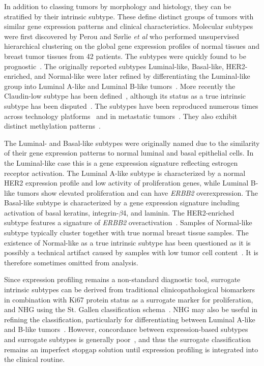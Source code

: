 \documentclass[11pt]{book}
\begin{document}
In addition to classing tumors by morphology and histology, they can be stratified by their intrinsic subtype. These define distinct groups of tumors with similar gene expression patterns and clinical characteristics. Molecular subtypes were first discovered by Perou and Sørlie \textit{et al} \cite{Perou:2000} who performed unsupervised hierarchical clustering on the global gene expression profiles of normal tissues and breast tumor tissues from 42 patients. The subtypes were quickly found to be prognostic~\cite{Sorlie:2001}. The originally reported subtypes Luminal-like, Basal-like, HER2-enriched, and Normal-like were later refined by differentiating the Luminal-like group into Luminal A-like and Luminal B-like tumors~\cite{Sorlie:2003}. More recently the Claudin-low subtype has been defined~\cite{Herschkowitz:2007}, although its status as a true intrinsic subtype has been disputed~\cite{Fougner:2020}. The subtypes have been reproduced numerous times across technology platforms~\cite{Hu:2006, Picornell:2019} and in metastatic tumors~\cite{Weigelt:2005, Tobin:2015, Prat:2016-met, Cejalvo:2017}. They also exhibit distinct methylation patterns~\cite{Holm:2010}.

The Luminal- and Basal-like subtypes were originally named due to the similarity of their gene expression patterns to normal luminal and basal epithelial cells. In the Luminal-like case this is a gene expression signature reflecting estrogen receptor activation. The Luminal A-like subtype is characterized by a normal HER2 expression profile and low activity of proliferation genes, while Luminal B-like tumors show elevated proliferation and can have \textit{ERBB2} overexpression. The Basal-like subtype is characterized by a gene expression signature including activation of basal keratins, integrin-$\beta$4, and laminin. The HER2-enriched subtype features a signature of \textit{ERBB2} overactivation~\cite{Perou:2000}. Samples of Normal-like subtype typically cluster together with true normal breast tissue samples. The existence of Normal-like as a true intrinsic subtype has been questioned as it is possibly a technical artifact caused by samples with low tumor cell content~\cite{Peppercorn:2008, Parker:2009, PratPerou:2011}. It is therefore sometimes omitted from analysis.

Since expression profiling remains a non-standard diagnostic tool, surrogate intrinsic subtypes can be derived from traditional clinicopathological biomarkers in combination with Ki67 protein status as a surrogate marker for proliferation, and NHG using the St. Gallen classification schema~\cite{Goldhirsch:2013}. NHG may also be useful in refining the classification, particularly for differentiating between Luminal A-like and B-like tumors~\cite{Curigliano:2017-deescalation, Ehinger:2017}. However, concordance between expression-based subtypes and surrogate subtypes is generally poor~\cite{Guiu:2012, Prat:2015-subtyping, Lundgren:2019}, and thus the surrogate classification remains an imperfect stopgap solution until expression profiling is integrated into the clinical routine.
\end{document}
